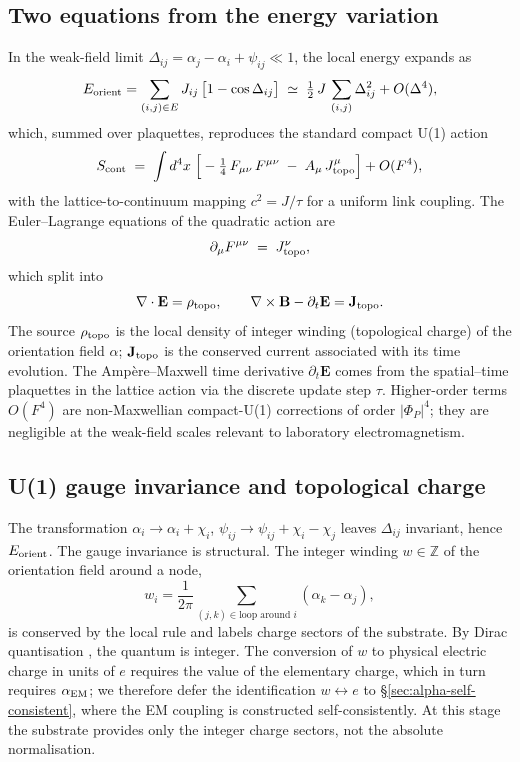 \documentclass[11pt,a4paper]{article}
\begin{document}
\subsection{Two equations from the energy variation}

In the weak-field limit
$\Delta_{ij} = \alpha_j - \alpha_i + \psi_{ij} \ll 1$, the
local energy expands as
\begin{equation}
E_{\rm orient}
= \sum_{(i,j) \in E} J_{ij}\,
\big[1 - \cos \Delta_{ij}\big]
\;\simeq\; \tfrac{1}{2}\,J\,\sum_{(i,j)} \Delta_{ij}^2
+ O(\Delta^4),
\end{equation}
which, summed over plaquettes, reproduces the standard compact
U(1) action
\begin{equation}
S_{\rm cont} \;=\; \int d^4 x\;
\Big[ -\tfrac{1}{4}\,F_{\mu\nu}\,F^{\mu\nu}
\;-\; A_\mu\,J^\mu_{\rm topo}\Big]
+ O(F^4),
\end{equation}
with the lattice-to-continuum mapping $c^2 = J/\tau$ for a
uniform link coupling. The Euler--Lagrange equations of the
quadratic action are
\begin{equation}
\partial_\mu F^{\mu\nu} \;=\; J^\nu_{\rm topo},
\end{equation}
which split into
\begin{equation}
\nabla \cdot \mathbf{E} = \rho_{\rm topo},
\qquad
\nabla \times \mathbf{B} - \partial_t \mathbf{E}
= \mathbf{J}_{\rm topo}.
\end{equation}
The source $\rho_{\rm topo}$ is the local density of integer
winding (topological charge) of the orientation field $\alpha$;
$\mathbf{J}_{\rm topo}$ is the conserved current associated
with its time evolution. The Amp\`ere--Maxwell time derivative
$\partial_t \mathbf{E}$ comes from the spatial--time plaquettes
in the lattice action via the discrete update step $\tau$.
Higher-order terms $O(F^4)$ are non-Maxwellian compact-U(1)
corrections of order $|\Phi_P|^4$; they are negligible at the
weak-field scales relevant to laboratory electromagnetism.

\subsection{U(1) gauge invariance and topological charge}

The transformation $\alpha_i \to \alpha_i + \chi_i$,
$\psi_{ij} \to \psi_{ij} + \chi_i - \chi_j$ leaves
$\Delta_{ij}$ invariant, hence $E_{\rm orient}$. The gauge
invariance is structural. The integer winding $w \in \mathbb{Z}$
of the orientation field around a node,
\[
w_i = \frac{1}{2\pi}
\sum_{(j,k) \in \text{loop around } i}
(\alpha_k - \alpha_j),
\]
is conserved by the local rule and labels charge sectors of
the substrate. By Dirac quantisation \cite{dirac1931}, the
quantum is integer. The conversion of $w$ to physical electric
charge in units of $e$ requires the value of the elementary
charge, which in turn requires $\alpha_{\rm EM}$; we therefore
defer the identification $w \leftrightarrow e$ to
\S\ref{sec:alpha-self-consistent}, where the EM coupling is
constructed self-consistently. At this stage the substrate
provides only the integer charge sectors, not the absolute
normalisation.
\end{document}
